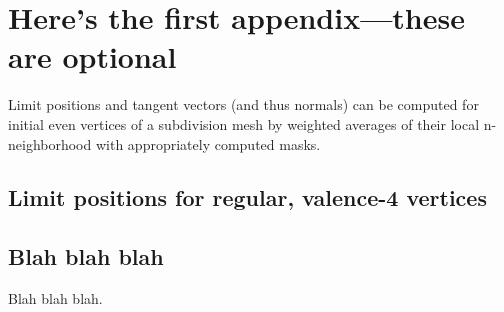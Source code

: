 %
%

\chapter{Here's the first appendix---these are optional}\label{ch:appa}

Limit positions and tangent vectors (and thus normals) can be computed for initial
even vertices of a subdivision mesh by weighted averages of their local
n-neighborhood with appropriately computed masks.

\section{Limit positions for regular, valence-4
vertices}\label{chsec:regular4vertex}

\section{Blah blah blah}

Blah blah blah.
